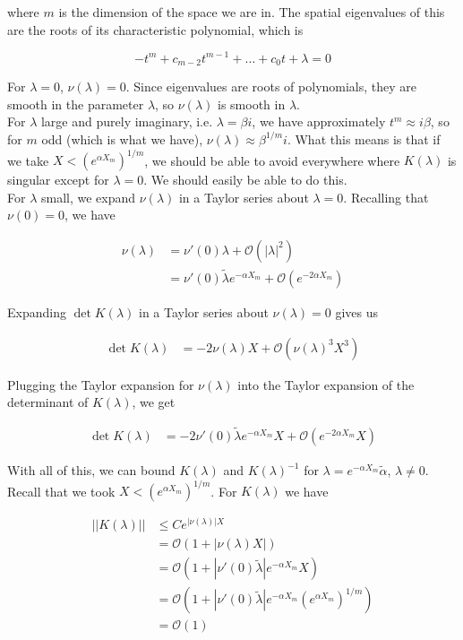 \documentclass[12pt]{article}
\begin{document}
where $m$ is the dimension of the space we are in. The spatial eigenvalues of this are the roots of its characteristic polynomial, which is

\[
-t^{m} + c_{m-2} t^{m-1} + \dots + c_0 t + \lambda = 0
\]

For $\lambda = 0$, $\nu(\lambda) = 0$. Since eigenvalues are roots of polynomials, they are smooth in the parameter $\lambda$, so $\nu(\lambda)$ is smooth in $\lambda$. \\

For $\lambda$ large and purely imaginary, i.e. $\lambda = \beta i$, we have approximately $t^m \approx i \beta$, so for $m$ odd (which is what we have), $\nu(\lambda) \approx \beta^{1/m} i$. What this means is that if we take $X < (e^{\alpha X_m})^{1/m}$, we should be able to avoid everywhere where $K(\lambda)$ is singular except for $\lambda = 0$. We should easily be able to do this.\\ 

For $\lambda$ small, we expand $\nu(\lambda)$ in a Taylor series about $\lambda = 0$. Recalling that $\nu(0) = 0$, we have

\begin{align*}
\nu(\lambda) &= \nu'(0)\lambda + \mathcal{O}(|\lambda|^2) \\
&= \nu'(0)\tilde{\lambda}e^{-\alpha X_m} + \mathcal{O}(e^{-2 \alpha X_m})
\end{align*}

Expanding $\det K(\lambda)$ in a Taylor series about $\nu(\lambda) = 0$ gives us

\begin{align*}
\det K(\lambda) &= -2 \nu(\lambda) X + \mathcal{O}(\nu(\lambda)^3 X^3)
\end{align*}

Plugging the Taylor expansion for $\nu(\lambda)$ into the Taylor expansion of the determinant of $K(\lambda)$, we get

\begin{align*}
\det K(\lambda) &= -2 \nu'(0)\tilde{\lambda}e^{-\alpha X_m} X + \mathcal{O}(e^{-2 \alpha X_m} X )
\end{align*}

With all of this, we can bound $K(\lambda)$ and $K(\lambda)^{-1}$ for $\lambda = e^{-\alpha X_m}\tilde{\alpha}$, $\lambda \neq 0$. Recall that we took $X < (e^{\alpha X_m})^{1/m}$. For $K(\lambda)$ we have

\begin{align*}
||K(\lambda)|| &\leq C e^{|\nu(\lambda)|X} \\
 &= \mathcal{O} (1 + |\nu(\lambda)X| ) \\
&= \mathcal{O}( 1 + |\nu'(0)\tilde{\lambda}|e^{-\alpha X_m}X ) \\
&= \mathcal{O}( 1 + |\nu'(0)\tilde{\lambda}|e^{-\alpha X_m}(e^{\alpha X_m})^{1/m} )\\
&= \mathcal{O}(1)
\end{align*}
\end{document}
